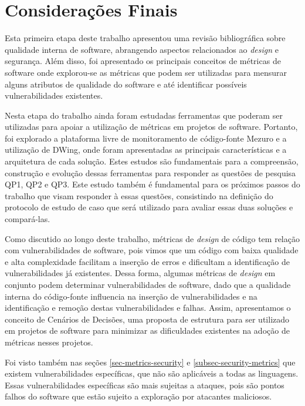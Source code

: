 \chapter{Considerações Finais}
\label{cap-consideracoesFinais}

Esta primeira etapa deste trabalho apresentou uma revisão bibliográfica sobre qualidade interna de software, abrangendo aspectos relacionados ao \emph{design} e segurança. Além disso, foi apresentado os principais conceitos de métricas de software onde explorou-se as métricas que podem ser utilizadas para mensurar alguns atributos de qualidade do software e até identificar possíveis vulnerabilidades existentes.

%

Nesta etapa do trabalho ainda foram estudadas ferramentas que poderam ser utilizadas para apoiar a utilização de métricas em projetos de software. Portanto, foi explorado a plataforma livre de monitoramento de código-fonte Mezuro e a utilização de DWing, onde foram apresentadas as principais características e a arquitetura de cada solução. Estes estudos são fundamentais para a compreensão, construção e evolução dessas ferramentas para responder as questões de pesquisa QP1, QP2 e QP3. Este estudo também é fundamental para os próximos passos do trabalho que visam responder à essas questões, consistindo na definição do protocolo de estudo de caso que será utilizado para avaliar essas duas soluções e compará-las.

%



Como discutido ao longo deste trabalho, métricas de \emph{design} de código tem relação com  vulnerabilidades de software, pois vimos que um código com baixa qualidade e alta complexidade facilitam a inserção de erros e dificultam a identificação de vulnerabilidades já existentes. Dessa forma, algumas métricas de \emph{design} em conjunto podem determinar vulnerabilidades de software, dado que a qualidade interna do código-fonte influencia na inserção de vulnerabilidades e na identificação e remoção destas vulnerabilidades e falhas. Assim, apresentamos o conceito de Cenários de Decisões, uma proposta de estrutura para ser utilizado em projetos de software para minimizar as dificuldades existentes na adoção de métricas nesses projetos.

%

Foi visto também nas seções \ref{sec-metrics-security} e \ref{subsec-security-metrics} que existem vulnerabilidades específicas, que não são aplicáveis a todas as linguagens. Essas vulnerabilidades específicas são mais sujeitas a ataques, pois são pontos falhos do software que estão sujeito a exploração por atacantes maliciosos. 

